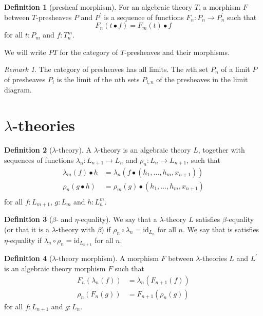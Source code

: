 \documentclass[a4paper]{amsbook}
\theoremstyle{definition}
\newtheorem{definition}{Definition}
\theoremstyle{remark}
\newtheorem{remark}{Remark}
\newcommand{\id}[1]{\ensuremath{\text{id}_{#1}}}
\begin{document}
  \begin{definition}[presheaf morphism]
    For an algebraic theory $ T $, a morphism $ F $ between $ T $-presheaves $ P $ and $ P^\prime $ is a sequence of functions $ F_n: P_n \to P^\prime_n $ such that
    \[ F_n(t \bullet f) = F_m(t) \bullet f \]
    for all $ t: P_m $ and $ f: T_n^m $.
  \end{definition}

  We will write $ PT $ for the category of $ T $-presheaves and their morphisms.

  \begin{remark}
    The category of presheaves has all limits. The $ n $th set $ \overline{P}_n $ of a limit $ \overline{P} $ of presheaves $ P_i $ is the limit of the $ n $th sets $ P_{i, n} $ of the presheaves in the limit diagram.
  \end{remark}

  \section{\texorpdfstring{$ \lambda $-}{lambda-}theories}

  \begin{definition}[$ \lambda $-theory]
    A $ \lambda $-theory is an algebraic theory $ L $, together with sequences of functions $ \lambda_n: L_{n + 1} \to L_n $ and $ \rho_n: L_n \to L_{n + 1} $, such that
    \begin{align*}
      \lambda_m(f) \bullet h &= \lambda_n(f \bullet (h_1, \dots, h_m, x_{n + 1}))\\
      \rho_n(g \bullet h) &= \rho_m(g) \bullet (h_1, \dots, h_m, x_{n + 1})\\
    \end{align*}
    for all $ f: L_{m + 1} $, $ g: L_m $ and $ h: L_n^m $.
  \end{definition}

  \begin{definition}[$ \beta $- and $ \eta $-equality]
    We say that a $ \lambda $-theory $ L $ satisfies $ \beta $-equality (or that it is a $ \lambda $-theory with $ \beta $) if $ \rho_n \circ \lambda_n = \id{L_n} $ for all $ n $. We say that is satisfies $ \eta $-equality if $ \lambda_n \circ \rho_n = \id{L_{n + 1}} $ for all $ n $.
  \end{definition}

  \begin{definition}[$ \lambda $-theory morphism]
    A morphism $ F $ between $ \lambda $-theories $ L $ and $ L^\prime $ is an algebraic theory morphism $ F $ such that
    \begin{align*}
      F_n(\lambda_n(f)) &= \lambda_n(F_{n + 1}(f))\\
      \rho_n(F_n(g)) &= F_{n + 1}(\rho_n(g))
    \end{align*}
    for all $ f: L_{n + 1} $ and $ g: L_n $.
  \end{definition}
\end{document}
